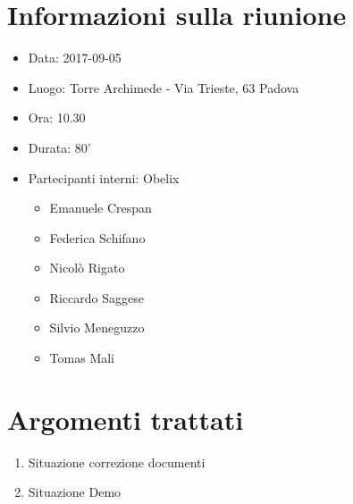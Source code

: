 \documentclass[10 pt,a4paper, openany]{article}
\date{}
\begin{document}
\paginatitolo
\section{Informazioni sulla riunione}

\begin{itemize}
\item[] Data: 2017-09-05
\item[] Luogo: Torre Archimede - Via Trieste, 63 Padova
\item[] Ora: 10.30
\item[] Durata: 80'
\item[] Partecipanti interni: Obelix
  \begin{itemize}
  \item[] Emanuele Crespan
  \item[] Federica Schifano
  \item[] Nicolò Rigato
  \item[] Riccardo Saggese
  \item[] Silvio Meneguzzo
  \item[] Tomas Mali
 \end{itemize}
\end{itemize}

\section{Argomenti trattati}
\begin{enumerate}
	\item Situazione correzione documenti	
	\item Situazione Demo

	
\end{enumerate}
\end{document}
